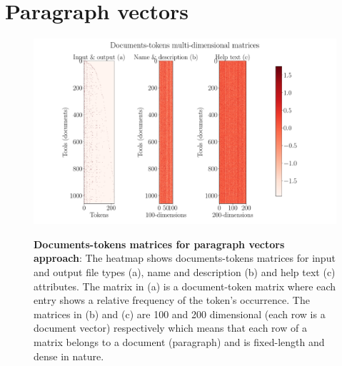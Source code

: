 \section{Paragraph vectors}

\begin{figure}[h]
\begin{centering}
    {\includegraphics[scale=0.35]{figures/Documents-tokens_doc2vec.pdf}}
    \caption[Documents-tokens matrices for paragraph vectors]{\textbf{Documents-tokens matrices for paragraph vectors approach}: The heatmap shows documents-tokens matrices for input and output file types (a), name and description (b) and help text (c) attributes. The matrix in (a) is a document-token matrix where each entry shows a relative frequency of the token's occurrence. The matrices in (b) and (c) are 100 and 200 dimensional (each row is a document vector) respectively which means that each row of a matrix belongs to a document (paragraph) and is fixed-length and dense in nature. }
\end{centering}
\end{figure}

